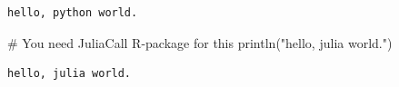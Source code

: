 \documentclass[
  letterpaper,
  DIV=11,
  numbers=noendperiod]{scrartcl}
\newenvironment{Shaded}{\begin{snugshade}}{\end{snugshade}}
\newcommand{\CommentTok}[1]{\textcolor[rgb]{0.37,0.37,0.37}{#1}}
\newcommand{\FunctionTok}[1]{\textcolor[rgb]{0.28,0.35,0.67}{#1}}
\newcommand{\NormalTok}[1]{\textcolor[rgb]{0.00,0.23,0.31}{#1}}
\newcommand{\StringTok}[1]{\textcolor[rgb]{0.13,0.47,0.30}{#1}}
\begin{document}
\begin{verbatim}
hello, python world.
\end{verbatim}

\begin{Shaded}
\begin{Highlighting}[]

\CommentTok{\# You need JuliaCall R{-}package for this}
\FunctionTok{println}\NormalTok{(}\StringTok{"hello, julia world."}\NormalTok{)}
\end{Highlighting}
\end{Shaded}

\begin{verbatim}
hello, julia world.
\end{verbatim}
\end{document}
